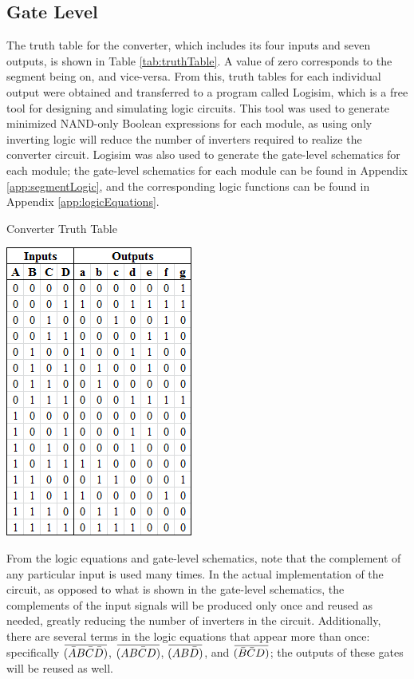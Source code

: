 \documentclass[12pt]{article}
\newcommand{\overbar}[1]{\mkern 1.5mu\overline{\mkern-1.5mu#1\mkern-1.5mu}\mkern 1.5mu} %
\begin{document}
\subsection{Gate Level} \label{sec:gateLevel}

The truth table for the converter, which includes its four inputs and seven outputs, is shown in Table \ref{tab:truthTable}.
A value of zero corresponds to the segment being on, and vice-versa.
From this, truth tables for each individual output were obtained and transferred to a program called Logisim, which is a free tool for designing and simulating logic circuits.
This tool was used to generate minimized NAND-only Boolean expressions for each module, as using only inverting logic will reduce the number of inverters required to realize the converter circuit.
Logisim was also used to generate the gate-level schematics for each module; the gate-level schematics for each module can be found in Appendix \ref{app:segmentLogic}, and the corresponding logic functions can be found in Appendix \ref{app:logicEquations}.


\begin{table}[H]
	\centering
	\caption{Converter Truth Table}
	\vspace*{2mm}
	\label{tab:truthTable}
	\includegraphics[width=0.4\linewidth, keepaspectratio]{hex7seg_truthTable.png}
\end{table}

\newpage
From the logic equations and gate-level schematics, note that the complement of any particular input is used many times.
In the actual implementation of the circuit, as opposed to what is shown in the gate-level schematics, the complements of the input signals will be produced only once and reused as needed, greatly reducing the number of inverters in the circuit.
Additionally, there are several terms in the logic equations that appear more than once: specifically $\overbar{(\bar{A}B\bar{C}\bar{D})}$, $\overbar{(AB\bar{C}D)}$, $\overbar{(AB\bar{D})}$, and $\overbar{(\bar{B}\bar{C}D)}$; the outputs of these gates will be reused as well.
\end{document}
